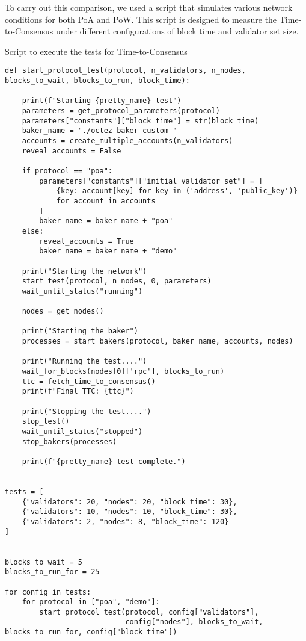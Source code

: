 To carry out this comparison, we used a script that simulates various network conditions for both PoA and PoW. This script is designed to measure the Time-to-Consensus under different configurations of block time and validator set size.


\begin{listing}[H]
\caption{Script to execute the tests for Time-to-Consensus}
\label{lst:python_code}
\begin{verbatim}
def start_protocol_test(protocol, n_validators, n_nodes, blocks_to_wait, blocks_to_run, block_time):

    print(f"Starting {pretty_name} test")
    parameters = get_protocol_parameters(protocol)
    parameters["constants"]["block_time"] = str(block_time)
    baker_name = "./octez-baker-custom-"
    accounts = create_multiple_accounts(n_validators)
    reveal_accounts = False

    if protocol == "poa":
        parameters["constants"]["initial_validator_set"] = [
            {key: account[key] for key in ('address', 'public_key')}
            for account in accounts
        ]
        baker_name = baker_name + "poa"
    else:
        reveal_accounts = True
        baker_name = baker_name + "demo"

    print("Starting the network")
    start_test(protocol, n_nodes, 0, parameters)
    wait_until_status("running")

    nodes = get_nodes()

    print("Starting the baker")
    processes = start_bakers(protocol, baker_name, accounts, nodes)

    print("Running the test....")
    wait_for_blocks(nodes[0]['rpc'], blocks_to_run)
    ttc = fetch_time_to_consensus()
    print(f"Final TTC: {ttc}")

    print("Stopping the test....")
    stop_test()
    wait_until_status("stopped")
    stop_bakers(processes)

    print(f"{pretty_name} test complete.")


tests = [
    {"validators": 20, "nodes": 20, "block_time": 30},
    {"validators": 10, "nodes": 10, "block_time": 30},
    {"validators": 2, "nodes": 8, "block_time": 120}
]


blocks_to_wait = 5
blocks_to_run_for = 25

for config in tests:
    for protocol in ["poa", "demo"]:
        start_protocol_test(protocol, config["validators"],
                            config["nodes"], blocks_to_wait, blocks_to_run_for, config["block_time"])
\end{verbatim}
\end{listing}


